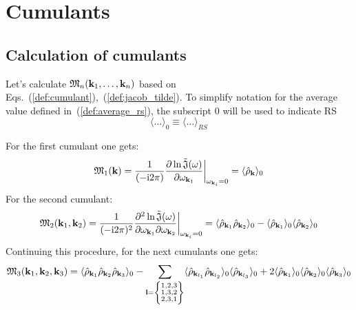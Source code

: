 \section{\label{sec:cumulants} Cumulants}
\subsection{Calculation of cumulants}
Let's calculate $\mathfrak{M}_n(\vb k_1, \dotsc, \vb k_n)$ based on Eqs.~(\ref{def:cumulant}),~(\ref{def:jacob_tilde}).
To simplify notation for the average value defined in~(\ref{def:average_rs}), the subscript $0$ will be used to indicate RS
$$ \langle \dotsc \rangle_0 \equiv \langle \dotsc \rangle_{RS} $$

For the first cumulant one gets:
\begin{equation}
	\label{m1_via_rho}
	\mathfrak{M}_1(\vb k) = \frac{1}{(-{\rm i}2\pi)} \frac{\partial \ln \tilde{\mathfrak{J}}(\omega)}{\partial \omega_{{\vb k}_1}} \bigg{|}_{\omega_{{\vb k}_i}=0} = \langle \hat{\rho}_{\vb k} \rangle_0
\end{equation}
For the second cumulant:
\begin{equation}
	\mathfrak{M}_2(\vb k_1, \vb k_2) = \frac{1}{(-{\rm i}2\pi)^2} \frac{\partial^2 \ln \tilde{\mathfrak{J}}(\omega)}{\partial \omega_{{\vb k}_1} \partial \omega_{{\vb k}_2}} \bigg{|}_{\omega_{{\vb k}_i}=0} 
	= \langle \hat{\rho}_{\vb k_1} \hat{\rho}_{\vb k_2} \rangle_0 - \langle \hat{\rho}_{\vb k_1} \rangle_0 \langle\hat{\rho}_{\vb k_2} \rangle_0
\end{equation}
Continuing this procedure, for the next cumulants one gets:
\begin{equation}
	\mathfrak{M}_3(\vb k_1, \vb k_2, \vb k_3) = 
	\langle \hat{\rho}_{\vb k_1} \hat{\rho}_{\vb k_2} \hat{\rho}_{\vb k_3} \rangle_0 
	- \sum_{\vb l = \left\{\substack{1,2,3 \\ 1,3,2 \\ 2,3,1}\right\}} 
	\langle \hat{\rho}_{\vb k_{l_1}} \hat{\rho}_{\vb k_{l_2}} \rangle_0 \langle \hat{\rho}_{\vb k_{l_3}} \rangle_0
	+ 2 \langle \hat{\rho}_{\vb k_1} \rangle_0 \langle\hat{\rho}_{\vb k_2} \rangle_0 \langle\hat{\rho}_{\vb k_3} \rangle_0
\end{equation}

